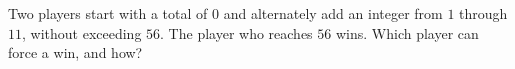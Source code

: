 Two players start with a total of $ 0 $ and alternately add an integer from $ 1 $ through $ 11 $, without exceeding $ 56 $. The player who reaches $ 56 $ wins. Which player can force a win, and how?
